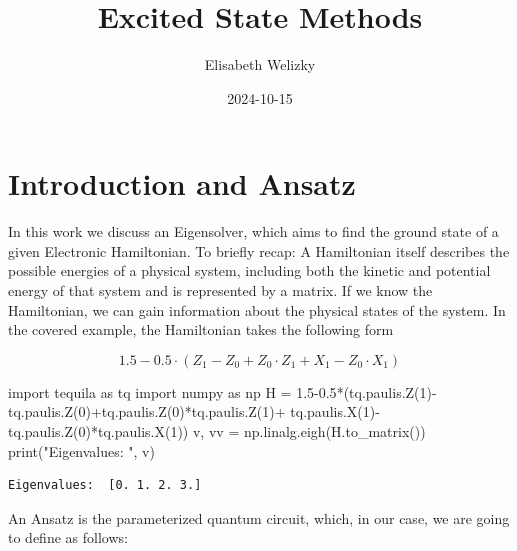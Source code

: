 \documentclass[
  letterpaper,
  DIV=11,
  numbers=noendperiod]{scrartcl}
\title{Excited State Methods}
\author{Elisabeth Welizky}
\date{2024-10-15}
\newenvironment{Shaded}{\begin{snugshade}}{\end{snugshade}}
\newcommand{\BuiltInTok}[1]{\textcolor[rgb]{0.00,0.23,0.31}{#1}}
\newcommand{\DecValTok}[1]{\textcolor[rgb]{0.68,0.00,0.00}{#1}}
\newcommand{\FloatTok}[1]{\textcolor[rgb]{0.68,0.00,0.00}{#1}}
\newcommand{\ImportTok}[1]{\textcolor[rgb]{0.00,0.46,0.62}{#1}}
\newcommand{\NormalTok}[1]{\textcolor[rgb]{0.00,0.23,0.31}{#1}}
\newcommand{\OperatorTok}[1]{\textcolor[rgb]{0.37,0.37,0.37}{#1}}
\newcommand{\StringTok}[1]{\textcolor[rgb]{0.13,0.47,0.30}{#1}}
\renewcommand*\contentsname{Table of contents}
\newcommand\contentsname{Table of contents}
\begin{document}
\maketitle

\renewcommand*\contentsname{Table of contents}
{
\hypersetup{linkcolor=}
\setcounter{tocdepth}{3}
\tableofcontents
}
\section{Introduction and Ansatz}\label{introduction-and-ansatz}

In this work we discuss an Eigensolver, which aims to find the ground
state of a given Electronic Hamiltonian. To briefly recap: A Hamiltonian
itself describes the possible energies of a physical system, including
both the kinetic and potential energy of that system and is represented
by a matrix. If we know the Hamiltonian, we can gain information about
the physical states of the system. In the covered example, the
Hamiltonian takes the following form

\[ 1.5  - 0.5 \cdot (Z_1 - Z_0 + Z_0 \cdot Z_1 + X_1 - Z_0 \cdot X_1)\]

\begin{Shaded}
\begin{Highlighting}[]
\ImportTok{import}\NormalTok{ tequila }\ImportTok{as}\NormalTok{ tq}
\ImportTok{import}\NormalTok{ numpy }\ImportTok{as}\NormalTok{ np}
\NormalTok{H }\OperatorTok{=} \FloatTok{1.5}\OperatorTok{{-}}\FloatTok{0.5}\OperatorTok{*}\NormalTok{(tq.paulis.Z(}\DecValTok{1}\NormalTok{)}\OperatorTok{{-}}\NormalTok{tq.paulis.Z(}\DecValTok{0}\NormalTok{)}\OperatorTok{+}\NormalTok{tq.paulis.Z(}\DecValTok{0}\NormalTok{)}\OperatorTok{*}\NormalTok{tq.paulis.Z(}\DecValTok{1}\NormalTok{)}\OperatorTok{+}\NormalTok{ tq.paulis.X(}\DecValTok{1}\NormalTok{)}\OperatorTok{{-}}\NormalTok{tq.paulis.Z(}\DecValTok{0}\NormalTok{)}\OperatorTok{*}\NormalTok{tq.paulis.X(}\DecValTok{1}\NormalTok{))}
\NormalTok{v, vv }\OperatorTok{=}\NormalTok{ np.linalg.eigh(H.to\_matrix())}
\BuiltInTok{print}\NormalTok{(}\StringTok{"Eigenvalues: "}\NormalTok{, v)}
\end{Highlighting}
\end{Shaded}

\begin{verbatim}
Eigenvalues:  [0. 1. 2. 3.]
\end{verbatim}

An Ansatz is the parameterized quantum circuit, which, in our case, we
are going to define as follows:
\end{document}
